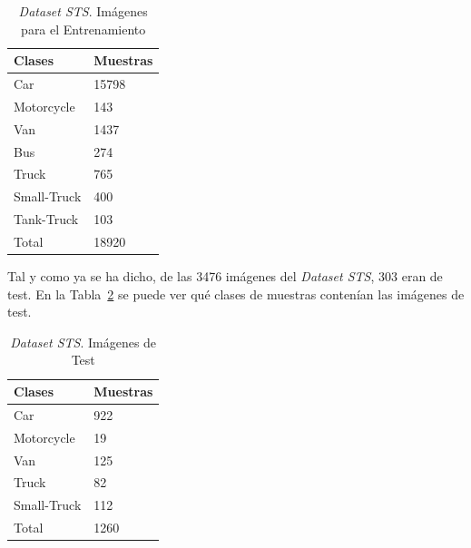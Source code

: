 \begin{table}[H]
\begin{center}
\begin{tabular}{|l|l|}
\hline
Clases & Muestras \\
\hline \hline
Car & 15798 \\ \hline
Motorcycle & 143 \\ \hline
Van & 1437 \\ \hline
Bus & 274 \\ \hline
Truck & 765 \\ \hline
Small-Truck & 400 \\ \hline
Tank-Truck & 103 \\ \hline
Total & 18920 \\ \hline
\end{tabular}
\caption{\textit{Dataset STS}. Imágenes para el Entrenamiento}
\label{tabla_database}
\end{center}
\end{table}

Tal y como ya se ha dicho, de las 3476 imágenes del \textit{Dataset STS}, 303 eran de test. En la Tabla~\ref{tabla_datos_primera_evaluacion} se puede ver qué clases de muestras contenían las imágenes de test.

\begin{table}[H]
\begin{center}
\begin{tabular}{|l|l|}
\hline
Clases & Muestras \\
\hline \hline
Car & 922 \\ \hline
Motorcycle & 19 \\ \hline
Van & 125 \\ \hline
Truck & 82 \\ \hline
Small-Truck & 112 \\ \hline
Total & 1260 \\ \hline
\end{tabular}
\caption{\textit{Dataset STS}. Imágenes de Test}
\label{tabla_datos_primera_evaluacion}
\end{center}
\end{table}

